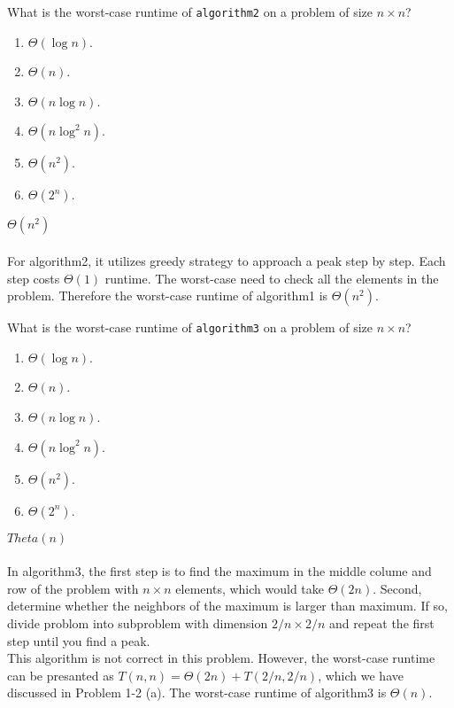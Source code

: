 \documentclass[12pt,twoside]{article}
\begin{document}
\begin{problems}
\begin{problemparts}
\problempart {} What is the worst-case runtime of \texttt{algorithm2} on a problem of size $n \times n$?
\begin{enumerate}
\item $\Theta(\log n)$.
\item $\Theta(n)$.
\item $\Theta(n \log n)$.
\item $\Theta(n \log^2 n)$.
\item $\Theta(n^2)$.
\item $\Theta(2^n)$.
\end{enumerate}

\ifsolution \solution{}
{\color{blue}$\Theta(n^2)$
\\
\\
For algorithm2, it utilizes greedy strategy to approach a peak  step by step. Each step costs $\Theta(1)$ runtime.
The worst-case need to check all the elements in the problem. Therefore the worst-case runtime of algorithm1 is 
$\Theta(n^2)$.}
\\
\fi

\problempart {} What is the worst-case runtime of \texttt{algorithm3} on a problem of size $n \times n$?
\begin{enumerate}
\item $\Theta(\log n)$.
\item $\Theta(n)$.
\item $\Theta(n \log n)$.
\item $\Theta(n \log^2 n)$.
\item $\Theta(n^2)$.
\item $\Theta(2^n)$.
\end{enumerate}

\ifsolution \solution{}
{\color{blue}$Theta(n)$
\\
\\
In algorithm3, the first step is to find the maximum in the middle colume and row of the problem with $n\times n$ elements,
which would take $\Theta(2n)$. Second, determine whether the neighbors of the maximum is larger than maximum. If so, 
divide problom into subproblem with dimension $2/n\times2/n$ and repeat the first step until you find a peak.
\\
This algorithm is not correct in this problem. However, the worst-case runtime can be presanted as $T(n,n) = \Theta(2n) +
T(2/n,2/n)$, which we have discussed in Problem 1-2 (a). The worst-case runtime of algorithm3 is $\Theta(n)$.}
\\


\end{problemparts}
\end{problems}
\end{document}
